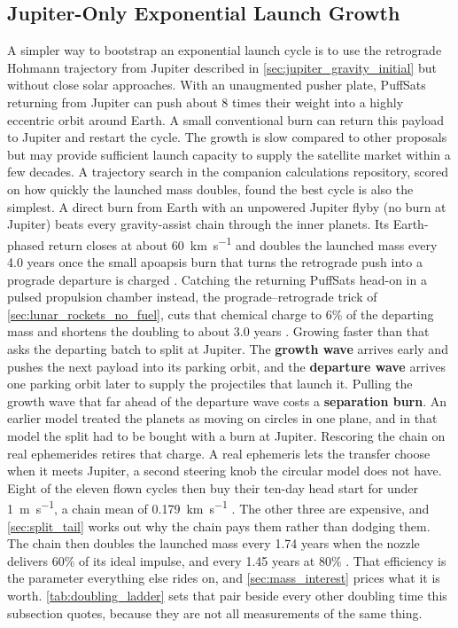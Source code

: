\documentclass{article}
\begin{document}
\subsection{Jupiter-Only Exponential Launch Growth}\label{sec:jupiter_only_growth}
A simpler way to bootstrap an exponential launch cycle is to use the retrograde Hohmann trajectory from Jupiter described in \autoref{sec:jupiter_gravity_initial} but without close solar approaches.   With an unaugmented pusher plate, PuffSats returning from Jupiter can push about 8 times their weight into a highly eccentric orbit around Earth.   A small conventional burn can return this payload to Jupiter and restart the cycle.     The growth is slow compared to other proposals but may provide sufficient launch capacity to supply the satellite market within a few decades.  A trajectory search in the companion calculations repository, scored on how quickly the launched mass doubles, found the best cycle is also the simplest. A direct burn from Earth with an unpowered Jupiter flyby (no burn at Jupiter) beats every gravity-assist chain through the inner planets. Its Earth-phased return closes at about \SI{60}{\kilo\meter\per\second} and doubles the launched mass every 4.0 years once the small apoapsis burn that turns the retrograde push into a prograde departure is charged \cite{Katz_aim_is_all_you_need_2025}. Catching the returning PuffSats head-on in a pulsed propulsion chamber instead, the prograde--retrograde trick of \autoref{sec:lunar_rockets_no_fuel}, cuts that chemical charge to 6\% of the departing mass and shortens the doubling to about 3.0 years \cite{Katz_aim_is_all_you_need_2025}. Growing faster than that asks the departing batch to split at Jupiter. The \textbf{growth wave} arrives early and pushes the next payload into its parking orbit, and the \textbf{departure wave} arrives one parking orbit later to supply the projectiles that launch it. Pulling the growth wave that far ahead of the departure wave costs a \textbf{separation burn}. An earlier model treated the planets as moving on circles in one plane, and in that model the split had to be bought with a burn at Jupiter. Rescoring the chain on real ephemerides retires that charge. A real ephemeris lets the transfer choose when it meets Jupiter, a second steering knob the circular model does not have. Eight of the eleven flown cycles then buy their ten-day head start for under \SI{1}{\meter\per\second}, a chain mean of \SI{0.179}{\kilo\meter\per\second} \cite{Katz_aim_is_all_you_need_2025}. The other three are expensive, and \autoref{sec:split_tail} works out why the chain pays them rather than dodging them. The chain then doubles the launched mass every 1.74 years when the nozzle delivers 60\% of its ideal impulse, and every 1.45 years at 80\% \cite{Katz_aim_is_all_you_need_2025}. That efficiency is the parameter everything else rides on, and \autoref{sec:mass_interest} prices what it is worth. \autoref{tab:doubling_ladder} sets that pair beside every other doubling time this subsection quotes, because they are not all measurements of the same thing.
\end{document}
